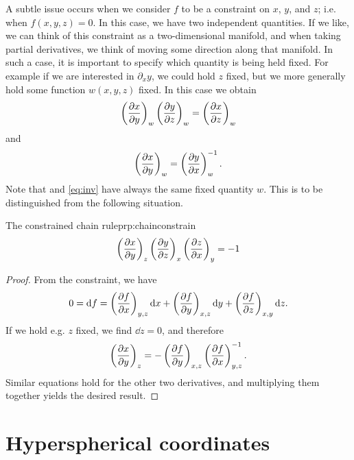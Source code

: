 A subtle issue occurs when we consider $f$ to be a constraint on $x$, $y$,
and $z$; i.e. when $f(x,y,z)=0$. In this case, we have two independent
quantities. If we like, we can think of this constraint as a two-dimensional
manifold, and when taking partial derivatives, we think of moving some direction
along that manifold. In such a case, it is important to specify which quantity
is being held fixed. For example if we are interested in $\partial_x y$, we
could hold $z$ fixed, but we more generally hold some function
$w(x,y,z)$ fixed. In this case we obtain
\begin{equation}\label{eq:chainw}
\left(\pder[x]{y}\right)_w
\left(\pder[y]{z}\right)_w
=\left(\pder[x]{z}\right)_w
\end{equation}
and
\begin{equation}\label{eq:inv}
\left(\pder[x]{y}\right)_w
=\left(\pder[y]{x}\right)_w^{-1}.
\end{equation}
Note that  and \eqref{eq:inv} have always the same
fixed quantity $w$. This is to be distinguished from the following
situation. 
\begin{proposition}{The constrained chain rule}{prp:chainconstrain}
$$
\left(\pder[x]{y}\right)_z
\left(\pder[y]{z}\right)_x
\left(\pder[z]{x}\right)_y
=-1
$$
\begin{proof}
From the constraint, we have
\begin{equation*}
0=\dd f=
 \left(\pder[f]{x}\right)_{y,z}\dd x
+\left(\pder[f]{y}\right)_{x,z}\dd y
+\left(\pder[f]{z}\right)_{x,y}\dd z.
\end{equation*}
If we hold e.g. $z$ fixed, we find $\dd z=0$, and therefore
\begin{equation*}
\left(\pder[x]{y}\right)_z=-\left(\pder[f]{y}\right)_{x,z}\left(\pder[f]{x}\right)_{y,z}^{-1}.
\end{equation*}
Similar equations hold for the other two derivatives, and multiplying them
together yields the desired result.
\end{proof}
\end{proposition}


\section{Hyperspherical coordinates}

